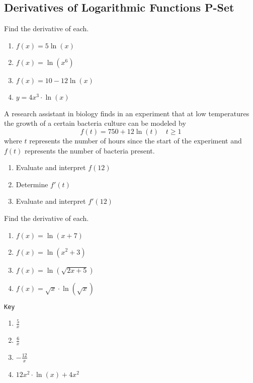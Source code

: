 \documentclass{article}
\newcounter{pset}
\newcounter{key}
\begin{document}
\subsection*{Derivatives of Logarithmic Functions P-Set}

Find the derivative of each.
\begin{multicols}{4}
\begin{enumerate}
    \item $f(x) = 5\ln(x)$
    \item $f(x) = \ln(x^6)$
    \item $f(x) = 10 - 12\ln(x)$
    \item $y = 4x^3 \cdot \ln(x)$
\end{enumerate}     \setcounter{pset}{\value{enumi}}
\end{multicols}

A research assistant in biology finds in an experiment that at low temperatures the growth of a certain bacteria culture can be modeled by
\[
f(t) = 750 + 12\ln(t) \quad t \geq 1
\]
where $t$ represents the number of hours since the start of the experiment and $f(t)$ represents the number of bacteria present.
\begin{enumerate}   \setcounter{enumi}{\value{pset}}
    \item Evaluate and interpret $f(12)$
    \item Determine $f'(t)$
    \item Evaluate and interpret $f'(12)$
\end{enumerate}     \setcounter{pset}{\value{enumi}}

Find the derivative of each.
\begin{multicols}{4}
\begin{enumerate}   \setcounter{enumi}{\value{pset}}
    \item $f(x) = \ln(x+7)$
    \item $f(x) = \ln(x^2+3)$
    \item $f(x) = \ln\left(\sqrt{2x+5}\right)$
    \item $f(x) = \sqrt{x} \cdot \ln\left(\sqrt{x}\right)$
\end{enumerate}     \setcounter{pset}{\value{enumi}}
\end{multicols}


\vfill

\dotfill \newline

\texttt{Key}
\begin{multicols}{4}
\begin{enumerate}
    \item $\frac{5}{x}$
    \item $\frac{6}{x}$
    \item $-\frac{12}{x}$
    \item $12x^2 \cdot \ln(x) + 4x^2$
\end{enumerate}     \setcounter{key}{\value{enumi}}
\end{multicols}
\end{document}
